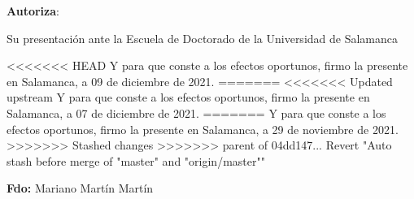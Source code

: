 \bigskip
\textbf{Autoriza}:
\bigskip

Su presentación ante la Escuela de Doctorado de la Universidad de Salamanca

\bigskip

<<<<<<< HEAD
Y para que conste a los efectos oportunos, firmo la presente en Salamanca, a 09 de diciembre de 2021. 
=======
<<<<<<< Updated upstream
Y para que conste a los efectos oportunos, firmo la presente en Salamanca, a 07 de diciembre de 2021. 
=======
Y para que conste a los efectos oportunos, firmo la presente en Salamanca, a 29 de noviembre de 2021. 
>>>>>>> Stashed changes
>>>>>>> parent of 04dd147... Revert "Auto stash before merge of "master" and "origin/master""

\bigskip

\bigskip

\bigskip

\bigskip

\bigskip

%
%
%
%


\textbf{Fdo:} Mariano Martín Martín 


%	

